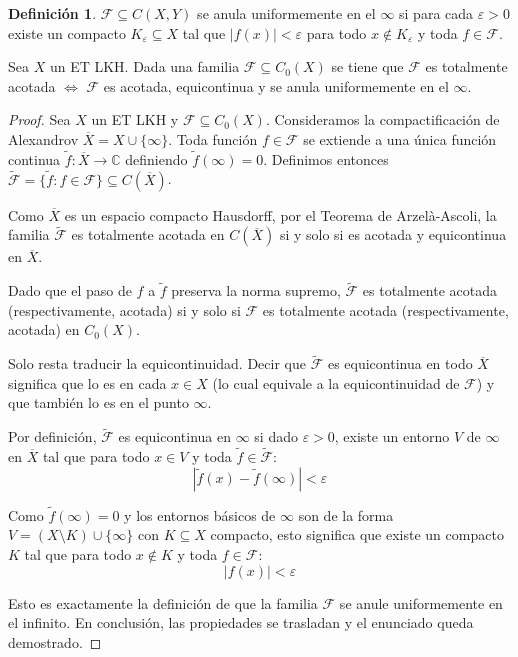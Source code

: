 \documentclass{article}
\theoremstyle{plain}
\theoremstyle{definition}
\newtheorem{definition}{Definición}[section]
\newenvironment{ejercicio}[1]{\begin{trivlist}
\item[\hskip \labelsep {\bfseries Ejercicio}\hskip \labelsep {\bfseries #1.}]}{\end{trivlist}}
\begin{document}
\begin{definition}
    \( \mathcal{F} \subseteq C(X, Y) \) se anula uniformemente en el \( \infty \) si para cada \( \varepsilon > 0 \) existe un compacto \( K_\varepsilon \subseteq X \) tal que \( |f(x)| < \varepsilon \) para todo \( x \notin K_\varepsilon \) y toda \( f \in \mathcal{F} \).
\end{definition}

\begin{ejercicio}{5}
    Sea \( X \) un ET LKH. Dada una familia \( \mathcal{F} \subseteq C_{0}(X) \) se tiene que \( \mathcal{F} \) es totalmente acotada \( \iff \) \( \mathcal{F} \) es acotada, equicontinua y se anula uniformemente en el \( \infty \).
\end{ejercicio}
\begin{proof}
    Sea \( X \) un ET LKH y \( \mathcal{F} \subseteq C_0(X) \). Consideramos la compactificación de Alexandrov \( \overline{X} = X \cup \{ \infty \} \).
    Toda función \( f \in \mathcal{F} \) se extiende a una única función continua \( \tilde{f} : \overline{X} \to \mathbb{C} \) definiendo \( \tilde{f}(\infty) = 0 \).
    Definimos entonces \( \tilde{\mathcal{F}} = \{ \tilde{f} : f \in \mathcal{F} \} \subseteq C(\overline{X}) \).

    Como \( \overline{X} \) es un espacio compacto Hausdorff, por el Teorema de Arzelà-Ascoli, la familia \( \tilde{\mathcal{F}} \) es totalmente acotada en \( C(\overline{X}) \) si y solo si es acotada y equicontinua en \( \overline{X} \).

    Dado que el paso de \( f \) a \( \tilde{f} \) preserva la norma supremo, \( \tilde{\mathcal{F}} \) es totalmente acotada (respectivamente, acotada) si y solo si \( \mathcal{F} \) es totalmente acotada (respectivamente, acotada) en \( C_0(X) \).

    Solo resta traducir la equicontinuidad. Decir que \( \tilde{\mathcal{F}} \) es equicontinua en todo \( \overline{X} \) significa que lo es en cada \( x \in X \) (lo cual equivale a la equicontinuidad de \( \mathcal{F} \)) y que también lo es en el punto \( \infty \).

    Por definición, \( \tilde{\mathcal{F}} \) es equicontinua en \( \infty \) si dado \( \varepsilon > 0 \), existe un entorno \( V \) de \( \infty \) en \( \overline{X} \) tal que para todo \( x \in V \) y toda \( \tilde{f} \in \tilde{\mathcal{F}} \):
    \[ | \tilde{f}(x) - \tilde{f}(\infty) | < \varepsilon \]

    Como \( \tilde{f}(\infty) = 0 \) y los entornos básicos de \( \infty \) son de la forma \( V = (X \setminus K) \cup \{ \infty \} \) con \( K \subseteq X \) compacto, esto significa que existe un compacto \( K \) tal que para todo \( x \notin K \) y toda \( f \in \mathcal{F} \):
    \[ | f(x) | < \varepsilon \]

    Esto es exactamente la definición de que la familia \( \mathcal{F} \) se anule uniformemente en el infinito. En conclusión, las propiedades se trasladan y el enunciado queda demostrado.
\end{proof}
\end{document}
